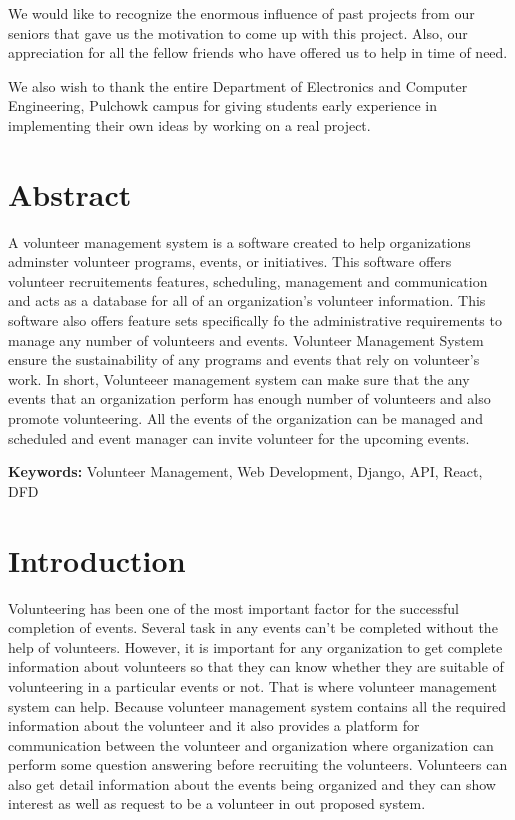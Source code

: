 \documentclass[12pt]{article}
\begin{document}
We would like to recognize the enormous influence of past projects from our seniors that gave us
the motivation to come up with this project. Also, our appreciation for all the fellow friends who
have offered us to help in time of need.

We also wish to thank the entire Department of Electronics and Computer Engineering, 
Pulchowk campus for giving students early experience in implementing their own ideas by
working on a real project.

\clearpage

\tableofcontents
\clearpage

\section{Abstract}
A volunteer management system is a software created to help organizations adminster volunteer programs, events, or initiatives. This software offers volunteer recruitements features, scheduling, management and communication and acts as a database for all of an organization's volunteer information. This software also offers feature sets specifically fo the administrative requirements to manage any number of volunteers and events. Volunteer Management System ensure the sustainability of any programs and events that rely on volunteer's work. In short, Volunteeer management system can make sure that the any events that an organization perform has enough number of volunteers and also promote volunteering. All the events of the organization can be managed and scheduled and event manager can invite volunteer for the upcoming events. 

\textbf{Keywords: } Volunteer Management, Web Development, Django, API, React, DFD 

\clearpage

\section{Introduction}
Volunteering has been one of the most important factor for the successful completion of events. Several task in any events can't be completed without the help of volunteers. However, it is important for any organization to get complete information about volunteers so that they can know whether they are suitable of volunteering in a particular events or not. That is where volunteer management system can help. Because volunteer management system contains all the required information about the volunteer and it also provides a platform for communication between the volunteer and organization where organization can perform some question answering before recruiting the volunteers. Volunteers can also get detail information about the events being organized and they can show interest as well as request to be a volunteer in out proposed system.
\end{document}

